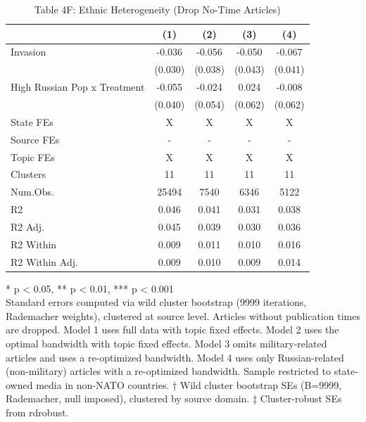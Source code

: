 \begin{table}[!t]
\caption{Table 4F: Ethnic Heterogeneity (Drop No-Time Articles)} 
\fontsize{12.0pt}{14.4pt}\selectfont
\begin{tabular*}{\linewidth}{@{\extracolsep{\fill}}lcccc}
\toprule
  & (1) & (2) & (3) & (4) \\ 
\midrule\addlinespace[2.5pt]
Invasion & -0.036 & -0.056 & -0.050 & -0.067 \\ 
 & (0.030) & (0.038) & (0.043) & (0.041) \\ 
High Russian Pop x Treatment & -0.055 & -0.024 & 0.024 & -0.008 \\ 
{} & {(0.040)} & {(0.054)} & {(0.062)} & {(0.062)} \\ 
State FEs & X & X & X & X \\ 
Source FEs & - & - & - & - \\ 
Topic FEs & X & X & X & X \\ 
Clusters & 11 & 11 & 11 & 11 \\ 
Num.Obs. & 25494 & 7540 & 6346 & 5122 \\ 
R2 & 0.046 & 0.041 & 0.031 & 0.038 \\ 
R2 Adj. & 0.045 & 0.039 & 0.030 & 0.036 \\ 
R2 Within & 0.009 & 0.011 & 0.010 & 0.016 \\ 
R2 Within Adj. & 0.009 & 0.010 & 0.009 & 0.014 \\ 
\bottomrule
\end{tabular*}
\begin{minipage}{\linewidth}
* p < 0.05, ** p < 0.01, *** p < 0.001\\
Standard errors computed via wild cluster bootstrap (9999 iterations, Rademacher
weights), clustered at source level. Articles without publication times are
dropped. Model 1 uses full data with topic fixed effects. Model 2 uses the
optimal bandwidth with topic fixed effects. Model 3 omits military-related
articles and uses a re-optimized bandwidth. Model 4 uses only Russian-related
(non-military) articles with a re-optimized bandwidth. Sample restricted to
state-owned media in non-NATO countries. † Wild cluster bootstrap SEs (B=9999,
Rademacher, null imposed), clustered by source domain. ‡ Cluster-robust SEs from
rdrobust.\\
\end{minipage}
\end{table}

